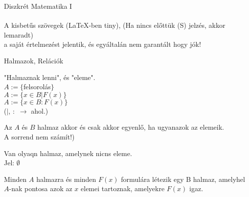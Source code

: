 \documentclass{beamer}
\newcommand{\mmedskip}{\vspace{0.5em}}
\newcommand{\mbigskip}{\vspace{1em}}
\begin{document}
\begin{frame}[plain]
\begin{tcolorbox}[center, colback={myyellow}, coltext={black}, colframe={myyellow}]
    {\Huge Diszkrét Matematika I}\\
\mbigskip
\\
A kisbetűs szövegek (LaTeX-ben tiny), (Ha nincs előttük (S) jelzés, akkor lemaradt)\\
a saját értelmezést jelentik, és egyáltalán nem garantált hogy jók!
\end{tcolorbox}
\end{frame}




\begin{frame}[plain]
\begin{tcolorbox}[center, colback={myyellow}, coltext={black}, colframe={myyellow}]
    {\Huge Halmazok, Relációk}
    \mmedskip
\end{tcolorbox}
\end{frame}

\begin{frame}
\begin{tcolorbox}[title={Def.: A halmazelmélet "Definiálatlan alapfogalmai"}]
"Halmaznak lenni", és "eleme".\\
$A := \{$felsorolás$\}$\\
$A := \{ x \in B | F(x) \}$\\
$A := \{ x \in B : F(x) \}$\\
{\footnotesize ($|$, $:$ $\rightarrow$ ahol.)}
\end{tcolorbox}

\begin{tcolorbox}[title={Def.:  Meghatározottsági Axióma (Halmazok egyenlősége)}]
Az $A$ és $B$ halmaz akkor és csak akkor egyenlő, ha ugyanazok az elemeik.\\
{\footnotesize A sorrend nem számít!)}
\end{tcolorbox}

\begin{tcolorbox}[title={Def.: Az üres halmz axiómája}]
Van olyaqn halmaz, amelynek nicns eleme.\\
Jel: $\emptyset$
\end{tcolorbox}

\begin{tcolorbox}[title={Def.: Részhalmaz-axióma}]
Minden $A$ halmazra és minden $F(x)$ formulára létezik egy B halmaz, amelyhel $A$-nak pontosa azok az $x$ elemei tartoznak, amelyekre $F(x)$ igaz.
\end{tcolorbox}
\end{frame}
\end{document}
